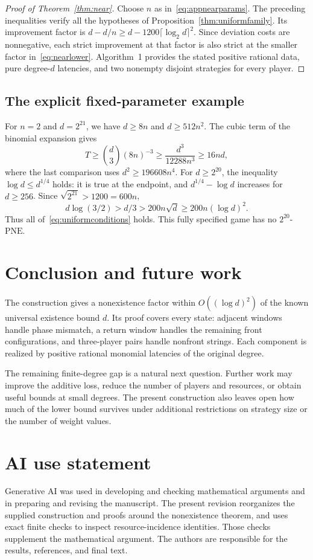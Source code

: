 \documentclass[11pt]{article}
\theoremstyle{definition}
\newcommand{\PNE}{\mathrm{PNE}}
\begin{document}
\begin{proof}[Proof of Theorem~\ref{thm:near}]
Choose $n$ as in~\eqref{eq:appnearparams}. The preceding inequalities verify all the hypotheses of Proposition~\ref{thm:uniformfamily}. Its improvement factor is $d-d/n\ge d-1200\lceil\log_2d\rceil^2$. Since deviation costs are nonnegative, each strict improvement at that factor is also strict at the smaller factor in~\eqref{eq:nearlower}. Algorithm~1 provides the stated positive rational data, pure degree-$d$ latencies, and two nonempty disjoint strategies for every player.
\end{proof}

\subsection{The explicit fixed-parameter example}\label{sec:fixedexample}
For $n=2$ and $d=2^{21}$, we have $d\ge8n$ and $d\ge512n^2$. The cubic term of the binomial expansion gives
\[
 T\ge\binom d3(8n)^{-3}
 \ge\frac{d^3}{12288n^3}\ge16nd,
\]
where the last comparison uses $d^2\ge196608n^4$. For $d\ge2^{20}$, the inequality $\log d\le d^{1/4}$ holds: it is true at the endpoint, and $d^{1/4}-\log d$ increases for $d\ge256$. Since $\sqrt{2^{21}}>1200=600n$,
\[
 d\log(3/2)>d/3>200n\sqrt d\ge200n(\log d)^2.
\]
Thus all of~\eqref{eq:uniformconditions} holds. This fully specified game has no $2^{20}$-$\PNE$.

\section{Conclusion and future work}\label{sec:conclusion}
The construction gives a nonexistence factor within $O((\log d)^2)$ of the known universal existence bound $d$. Its proof covers every state: adjacent windows handle phase mismatch, a return window handles the remaining front configurations, and three-player pairs handle nonfront strings. Each component is realized by positive rational monomial latencies of the original degree.

The remaining finite-degree gap is a natural next question. Further work may improve the additive loss, reduce the number of players and resources, or obtain useful bounds at small degrees. The present construction also leaves open how much of the lower bound survives under additional restrictions on strategy size or the number of weight values.

\section*{AI use statement}
Generative AI was used in developing and checking mathematical arguments and in preparing and revising the manuscript. The present revision reorganizes the supplied construction and proofs around the nonexistence theorem, and uses exact finite checks to inspect resource-incidence identities. Those checks supplement the mathematical argument. The authors are responsible for the results, references, and final text.



\end{document}
